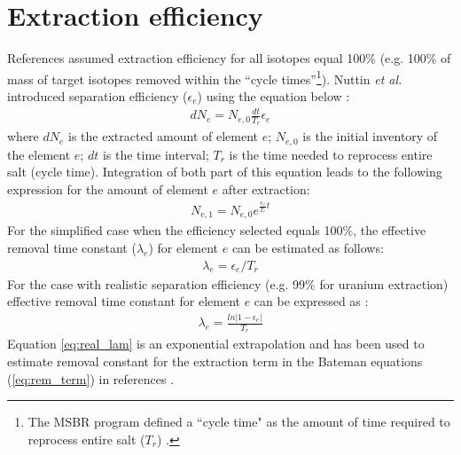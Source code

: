 \section{Extraction efficiency}
References \cite{rykhlevskii_modeling_2019, li_optimization_2018, de_troullioud_de_lanversin_toward_2017, park_whole_2015, sheu_depletion_2013} assumed extraction efficiency for all isotopes equal 100\% (e.g. 100\% of mass of target isotopes removed within the ``cycle times''\footnote{ The \gls{MSBR} program defined a ``cycle time" as the amount of 
time required to reprocess entire salt ($T_r$) \cite{robertson_conceptual_1971}.}). 
Nuttin \emph{et al.} introduced separation efficiency ($\epsilon_e$) using the 
equation below \cite{nuttin_potential_2005}:
\begin{align}
dN_e = N_{e, 0} \frac{dt}{T_r} \epsilon_e
\end{align}
where $dN_e$ is the extracted amount of element $e$; 
$N_{e, 0}$ is the initial inventory of the element $e$; 
$dt$ is the time interval; 
$T_r$ is the time needed to reprocess entire salt (cycle time). 
Integration of both part of this equation leads to the
following expression for the amount of element $e$ after extraction:
\begin{align}
N_{e, 1} = N_{e, 0} e^{\frac{\epsilon_e}{T_r}t}
\end{align}
For the simplified case when the efficiency selected equals 
100\%, the effective removal 
time constant 
($\lambda_e$) for element $e$ can be estimated as follows:
\begin{align} 
\lambda_e = \epsilon_e / T_r  \label{eq:100_lam}
\end{align}
For the case with realistic separation efficiency (e.g. 99\% for uranium extraction) effective removal time constant for element $e$ can be expressed as
 \cite{nuttin_potential_2005}:
\begin{align}  
\lambda_e = \frac{ln |1-\epsilon_e|}{T_r} \label{eq:real_lam}
\end{align}
Equation \ref{eq:real_lam} is an exponential extrapolation and has been 
used to estimate removal constant for the
extraction term in the Bateman equations (\ref{eq:rem_term}) in references \cite{nuttin_potential_2005, betzler_implementation_2017, doligez_coupled_2014}.

